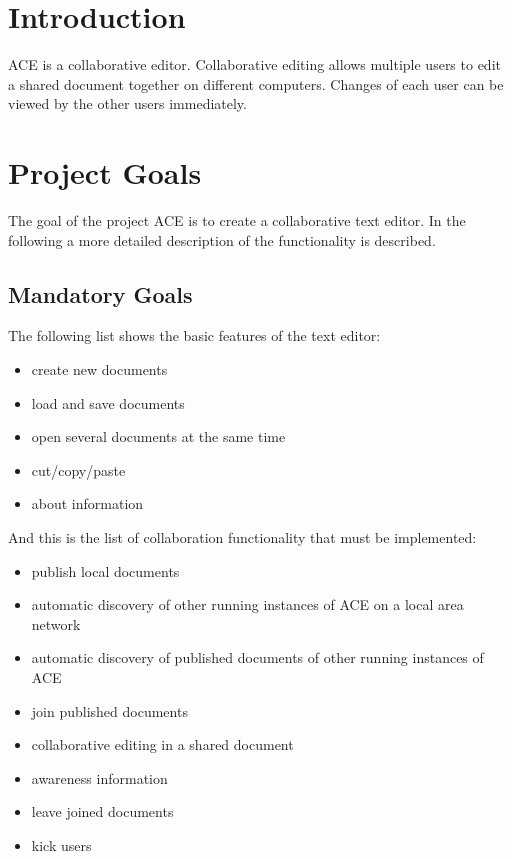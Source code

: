 \documentclass[11pt,a4paper]{article}
\begin{document}


\section{Introduction}

ACE is a collaborative editor. Collaborative editing allows multiple users
to edit a shared document together on different computers. Changes of each user can be viewed 
by the other users immediately.

\section{Project Goals}

The goal of the project ACE is to create a collaborative text editor. In the following a more detailed
description of the functionality is described.

\subsection{Mandatory Goals}

The following list shows the basic features of the text editor:

\begin{itemize}
 \item create new documents
 \item load and save documents
 \item open several documents at the same time
 \item cut/copy/paste
 \item about information
\end{itemize}

And this is the list of collaboration functionality that must be implemented:

\begin{itemize}
 \item publish local documents
 \item automatic discovery of other running instances of ACE on a local area network
 \item automatic discovery of published documents of other running instances of ACE
 \item join published documents
 \item collaborative editing in a shared document
 \item awareness information
 \item leave joined documents
 \item kick users
\end{itemize}
\end{document}
